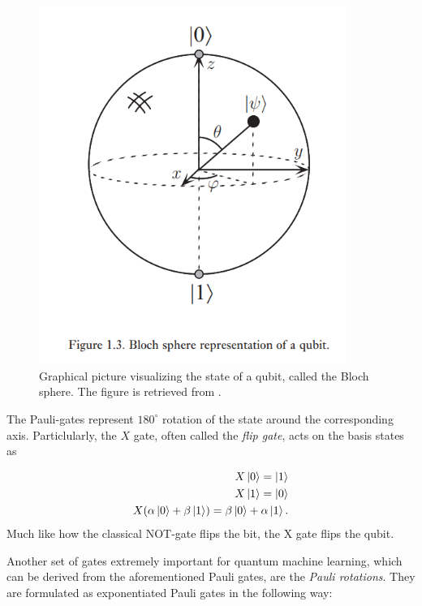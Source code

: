 \begin{figure}[htp]
    \centering
    \includegraphics[width=10cm]{latex/figures/Blochsphere.PNG}
    \caption{Graphical picture visualizing the state of a qubit, called the Bloch sphere. The figure is retrieved from \cite{NielsenQuantum}.}
    \label{fig:blochsphere}
\end{figure}

The Pauli-gates represent $180^{\circ}$ rotation of the state around the corresponding axis. Particlularly, the $X$ gate, often called the \emph{flip gate}, acts on the basis states as

\begin{equation}
\begin{aligned}
    X\ket{0} = \ket{1} \\
    X\ket{1} = \ket{0} \\
    X(\alpha \ket{0} + \beta\ket{1}) = \beta \ket{0} + \alpha\ket{1}.
\end{aligned}    
\end{equation}
Much like how the classical NOT-gate flips the bit, the X gate flips the qubit.

Another set of gates extremely important for quantum machine learning, which can be derived from the aforementioned Pauli gates, are the \emph{Pauli rotations}. They are formulated as exponentiated Pauli gates in the following way:

